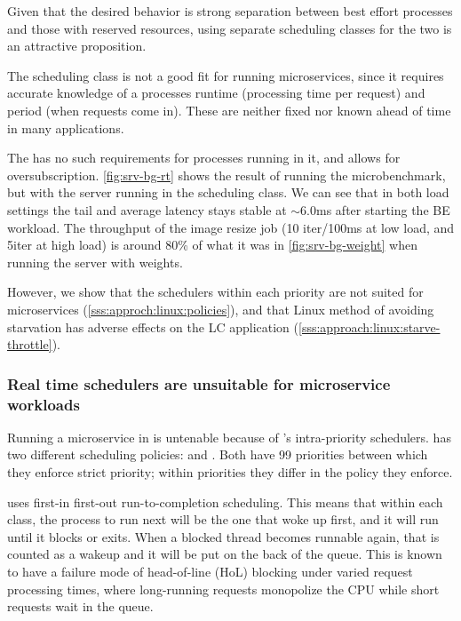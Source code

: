Given that the desired behavior is strong separation between best effort
processes and those with reserved resources, using separate scheduling classes
for the two is an attractive proposition. 

The \deadlineclass{} scheduling class is not a good fit for running
microservices, since it requires accurate knowledge of a processes runtime
(processing time per request) and period (when requests come in). These are
neither fixed nor known ahead of time in many applications. 

The \rtclass{} has no such requirements for processes running in it, and allows
for oversubscription. \autoref{fig:srv-bg-rt} shows the result of running the
microbenchmark, but with the server running in the \rtclass{} scheduling class.
We can see that in both load settings the tail and average latency stays stable
at $\sim$6.0ms after starting the BE workload. The throughput of the image
resize job (10 iter/100ms at low load, and 5iter at high load) is around 80\% of
what it was in \autoref{fig:srv-bg-weight} when running the server with
\cgroups{} weights.


However, we show that the schedulers within each priority are not suited for
microservices (\autoref{sss:approch:linux:policies}), and that Linux method of
avoiding starvation has adverse effects on the LC application
(\autoref{sss:approach:linux:starve-throttle}).

\subsubsection{Real time schedulers are unsuitable for microservice
workloads}\label{sss:approch:linux:policies}

Running a microservice in \rtclass{} is untenable because of \rtclass{}'s
intra-priority schedulers. \rtclass{} has two different scheduling policies:
\schedfifo{} and \schedrr{}. Both have 99 priorities between which they enforce
strict priority; within priorities they differ in the policy they enforce.

\schedfifo{} uses first-in first-out run-to-completion scheduling. This means
that within each class, the process to run next will be the one that woke up
first, and it will run until it blocks or exits. When a blocked thread becomes
runnable again, that is counted as a wakeup and it will be put on the back of
the queue. This is known to have a failure mode of head-of-line (HoL) blocking
under varied request processing times, where long-running requests monopolize
the CPU while short requests wait in the queue.


